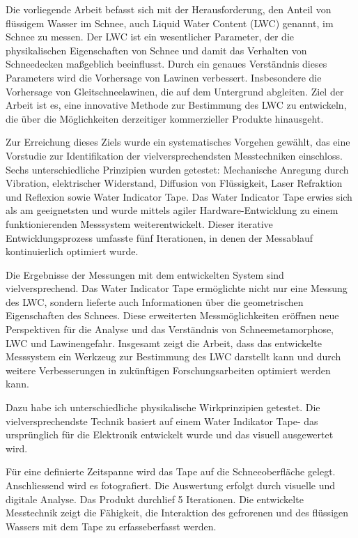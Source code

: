 Die vorliegende Arbeit befasst sich mit der Herausforderung, den Anteil von flüssigem Wasser im Schnee, auch Liquid Water Content (LWC) genannt, im Schnee zu messen. Der LWC ist ein wesentlicher Parameter, der die physikalischen Eigenschaften von Schnee und damit das Verhalten von Schneedecken maßgeblich beeinflusst. Durch ein genaues Verständnis dieses Parameters wird die Vorhersage von Lawinen verbessert. Insbesondere die Vorhersage von Gleitschneelawinen, die auf dem Untergrund abgleiten. Ziel der Arbeit ist es, eine innovative Methode zur Bestimmung des LWC zu entwickeln, die über die Möglichkeiten derzeitiger kommerzieller Produkte hinausgeht.

Zur Erreichung dieses Ziels wurde ein systematisches Vorgehen gewählt, das eine Vorstudie zur Identifikation der vielversprechendsten Messtechniken einschloss. Sechs unterschiedliche Prinzipien wurden getestet: Mechanische Anregung durch Vibration, elektrischer Widerstand, Diffusion von Flüssigkeit, Laser Refraktion und Reflexion sowie Water Indicator Tape. Das Water Indicator Tape erwies sich als am geeignetsten und wurde mittels agiler Hardware-Entwicklung zu einem funktionierenden Messsystem weiterentwickelt. Dieser iterative Entwicklungsprozess umfasste fünf Iterationen, in denen der Messablauf kontinuierlich optimiert wurde.

Die Ergebnisse der Messungen mit dem entwickelten System sind vielversprechend. Das Water Indicator Tape ermöglichte nicht nur eine Messung des LWC, sondern lieferte auch Informationen über die geometrischen Eigenschaften des Schnees. Diese erweiterten Messmöglichkeiten eröffnen neue Perspektiven für die Analyse und das Verständnis von Schneemetamorphose, LWC und Lawinengefahr. Insgesamt zeigt die Arbeit, dass das entwickelte Messsystem ein Werkzeug zur Bestimmung des LWC darstellt kann und durch weitere Verbesserungen in zukünftigen Forschungsarbeiten optimiert werden kann.

\iffalse

Dazu habe ich unterschiedliche  physikalische Wirkprinzipien getestet. 
Die vielversprechendste Technik basiert auf einem Water Indikator Tape- das ursprünglich für die Elektronik entwickelt wurde und  das visuell ausgewertet wird.

 Für eine definierte Zeitspanne wird das Tape auf die Schneeoberfläche gelegt. Anschliessend wird es fotografiert. Die Auswertung erfolgt durch visuelle und digitale Analyse.
Das Produkt durchlief 5 Iterationen. Die entwickelte Messtechnik zeigt die Fähigkeit, die Interaktion des gefrorenen und des flüssigen Wassers mit dem Tape zu erfasseberfasst werden.

